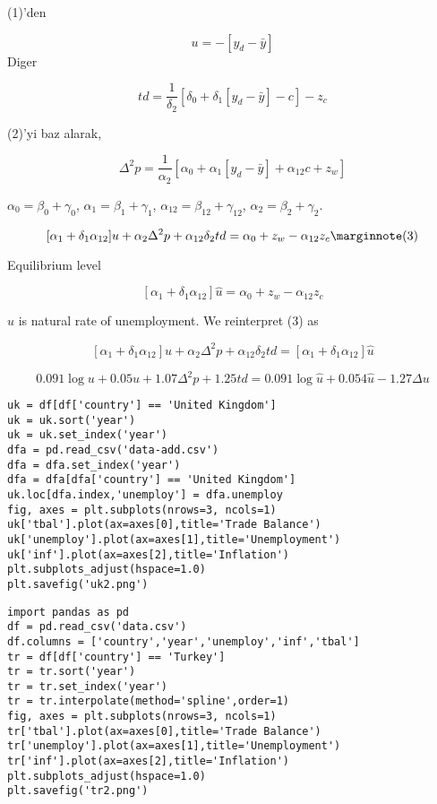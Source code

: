\documentclass[12pt,fleqn]{article}\usepackage{../../common}
\begin{document}
(1)'den

%
$$ u = - [y_d - \bar{y}]  $$
Diger

%
$$ td = \frac{1}{\delta_2} [ \delta_0 + \delta_1 [y_d - \bar{y} ]  - c ] - z_c $$

(2)'yi baz alarak,

%
$$
\Delta^2 p = \frac{1}{\alpha_2} [\alpha_0 + \alpha_1 [y_d - \bar{y} ] +
\alpha_{12}c + z_w ] 
$$

$\alpha_0 = \beta_0 + \gamma_0$, $\alpha_1 = \beta_1 + \gamma_1$, $\alpha_{12} =
\beta_{12} + \gamma_{12}$, $\alpha_2 = \beta_2 + \gamma_2$.

%
$$ [ \alpha_1 + \delta_1 \alpha_{12}]u + \alpha_2 \Delta^2 p +
\alpha_{12} \delta_2 td = \alpha_0 + z_w - \alpha_{12}z_c
\mlabel{3}
$$

Equilibrium level

%
$$ [ \alpha_1 + \delta_1 \alpha_{12} ] \hat{u} = \alpha_0 + z_w - \alpha_{12}z_c  $$

$\hat{u}$ is natural rate of unemployment. We reinterpret (3) as


%
$$ [ \alpha_1 + \delta_1 \alpha_{12}]u + \alpha_2 \Delta^2 p +
\alpha_{12} \delta_2 td = [\alpha_1 + \delta_1 \alpha_{12} ] \hat{u}
$$


%
$$
0.091 \log u + 0.05 u + 1.07 \Delta^2 p + 1.25 td  =
0.091 \log \hat{u} + 0.054 \hat{u} - 1.27 \Delta u
$$










\begin{verbatim}
uk = df[df['country'] == 'United Kingdom']
uk = uk.sort('year')
uk = uk.set_index('year')
dfa = pd.read_csv('data-add.csv')
dfa = dfa.set_index('year')
dfa = dfa[dfa['country'] == 'United Kingdom']
uk.loc[dfa.index,'unemploy'] = dfa.unemploy
fig, axes = plt.subplots(nrows=3, ncols=1)
uk['tbal'].plot(ax=axes[0],title='Trade Balance')
uk['unemploy'].plot(ax=axes[1],title='Unemployment')
uk['inf'].plot(ax=axes[2],title='Inflation')
plt.subplots_adjust(hspace=1.0)
plt.savefig('uk2.png')
\end{verbatim}


\begin{verbatim}
import pandas as pd
df = pd.read_csv('data.csv')
df.columns = ['country','year','unemploy','inf','tbal']
tr = df[df['country'] == 'Turkey']
tr = tr.sort('year')
tr = tr.set_index('year')
tr = tr.interpolate(method='spline',order=1)
fig, axes = plt.subplots(nrows=3, ncols=1)
tr['tbal'].plot(ax=axes[0],title='Trade Balance')
tr['unemploy'].plot(ax=axes[1],title='Unemployment')
tr['inf'].plot(ax=axes[2],title='Inflation')
plt.subplots_adjust(hspace=1.0)
plt.savefig('tr2.png')
\end{verbatim}
\end{document}
